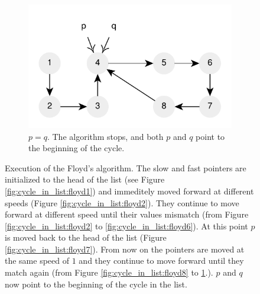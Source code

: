 \begin{figure}
\begin{subfigure}[l]{0.36\textwidth}
		\includegraphics[width=1\linewidth]{sources/cycle_in_list/images/floyd10}
		\caption{$p = q$. The algorithm stops, and both $p$ and $q$ point to the beginning of the cycle.}
		\label{fig:cycle_in_list:floyd10}
	 \end{subfigure}
	 \caption[Execution of the Floyd’s algorithm]{Execution of the Floyd’s algorithm. The slow and
	  fast pointers are initialized to the head of the list (see Figure
	  \ref{fig:cycle_in_list:floyd1}) and immeditely moved forward at different speeds (Figure
	  \ref{fig:cycle_in_list:floyd2}). They continue to move forward at different speed until their
	  values mismatch (from Figure \ref{fig:cycle_in_list:floyd2} to
	  \ref{fig:cycle_in_list:floyd6}). At this point $p$ is moved back to the head of the list
	  (Figure \ref{fig:cycle_in_list:floyd7}). From now on the pointers are moved at the same speed
	  of $1$ and they continue to move forward until they match again (from Figure
	  \ref{fig:cycle_in_list:floyd8} to \ref{fig:cycle_in_list:floyd10}.). $p$ and $q$ now point to
	  the beginning of the cycle in the list.}
	  \label{fig:cycle_in_list:floyd}
\end{figure}
